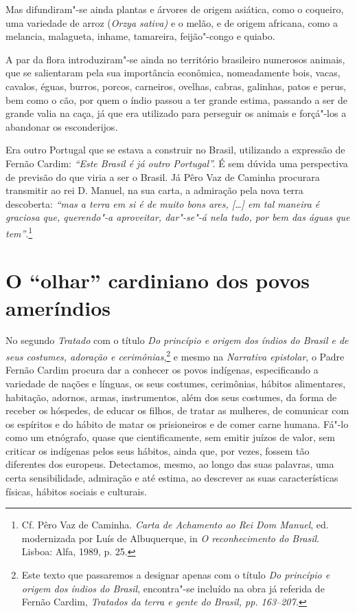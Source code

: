 Mas difundiram"-se ainda plantas e árvores de origem asiática, como o
coqueiro, uma variedade de arroz (\textit{Orzya sativa)} e o melão, e de
origem africana, como a melancia, malagueta, inhame, tamareira,
feijão"-congo e quiabo.

A par da flora introduziram"-se ainda no território brasileiro
numerosos animais, que se salientaram pela sua importância econômica,
nomeadamente bois, vacas, cavalos, éguas, burros, porcos, carneiros,
ovelhas, cabras, galinhas, patos e perus, bem como o cão, por quem o
índio passou a ter grande estima, passando a ser de grande valia na
caça, já que era utilizado para perseguir os animais e forçá"-los a
abandonar os esconderijos.

Era outro Portugal que se estava a construir no Brasil, utilizando a
expressão de Fernão Cardim: \textit{``Este Brasil é já outro Portugal''.} 
É sem dúvida uma perspectiva de previsão do que viria a ser o Brasil.
Já Pêro Vaz de Caminha procurara transmitir ao rei D. Manuel, na sua
carta, a admiração pela nova terra descoberta: \textit{``mas a
terra em si é de muito bons ares, [\ldots] em tal maneira é graciosa que,
querendo"-a aproveitar, dar"-se"-á nela tudo, por bem das águas que
tem''}.\footnote{ Cf. Pêro Vaz de Caminha. \textit{Carta de
Achamento ao Rei Dom Manuel}, ed. modernizada por Luís de Albuquerque,
in \textit{O reconhecimento do Brasil}. Lisboa: Alfa, 1989, p. 25.} 

\section{O ``olhar'' cardiniano dos povos ameríndios} 

 No segundo \textit{Tratado} com o título \textit{Do
princípio e origem dos índios do Brasil e de seus costumes, adoração e
cerimônias},\footnote{ Este texto que passaremos a designar apenas
com o título \textit{Do princípio e origem dos índios do Brasil}, 
encontra"-se incluído na obra já referida de Fernão Cardim,
\textit{Tratados da terra e gente do Brasil, pp. 163--207.}} e mesmo na
\textit{Narrativa epistolar}, o Padre Fernão Cardim procura dar a
conhecer os povos indígenas, especificando a variedade de nações e
línguas, os seus costumes, cerimônias, hábitos alimentares, habitação,
adornos, armas, instrumentos, além dos seus costumes, da forma
de receber os hóspedes, de educar os filhos, de tratar as mulheres, de
comunicar com os espíritos e do hábito de matar os prisioneiros e de
comer carne humana. Fá"-lo como um etnógrafo, quase que
cientificamente, sem emitir juízos de valor, sem criticar os indígenas
pelos seus hábitos, ainda que, por vezes, fossem tão diferentes dos
europeus. Detectamos, mesmo, ao longo das suas palavras, uma certa
sensibilidade, admiração e até estima, ao descrever as suas
características físicas, hábitos sociais e culturais.

